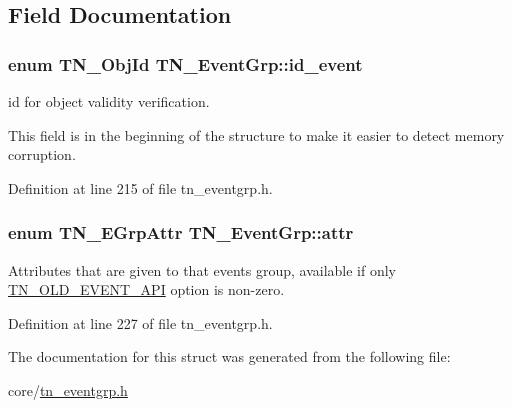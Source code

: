 \subsection{Field Documentation}
\hypertarget{structTN__EventGrp_a0bdf55b6117237122efeefcdf6802d37}{
\subsubsection[{id\+\_\+event}]{\setlength{\rightskip}{0pt plus 5cm}enum {\bf T\+N\+\_\+\+Obj\+Id} T\+N\+\_\+\+Event\+Grp\+::id\+\_\+event}}\label{structTN__EventGrp_a0bdf55b6117237122efeefcdf6802d37}


id for object validity verification. 

This field is in the beginning of the structure to make it easier to detect memory corruption. 

Definition at line 215 of file tn\+\_\+eventgrp.\+h.

\hypertarget{structTN__EventGrp_ac247c74950bd8ae6f721ff220e5a2402}{
\subsubsection[{attr}]{\setlength{\rightskip}{0pt plus 5cm}enum {\bf T\+N\+\_\+\+E\+Grp\+Attr} T\+N\+\_\+\+Event\+Grp\+::attr}}\label{structTN__EventGrp_ac247c74950bd8ae6f721ff220e5a2402}


Attributes that are given to that events group, available if only {\ttfamily \hyperlink{tn__cfg__default_8h_ac61d5f6a716cdcab205a2c8afbde4242}{T\+N\+\_\+\+O\+L\+D\+\_\+\+E\+V\+E\+N\+T\+\_\+\+A\+P\+I}} option is non-\/zero. 



Definition at line 227 of file tn\+\_\+eventgrp.\+h.



The documentation for this struct was generated from the following file\+:\begin{DoxyCompactItemize}
\item 
core/\hyperlink{tn__eventgrp_8h}{tn\+\_\+eventgrp.\+h}\end{DoxyCompactItemize}
